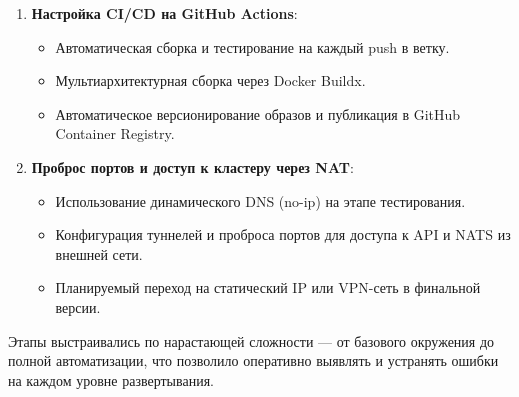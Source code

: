 \documentclass[14pt, a4paper]{extreport}
\begin{document}
\begin{enumerate}
\item \textbf{Настройка CI/CD на GitHub Actions}:
\begin{itemize}
\item Автоматическая сборка и тестирование на каждый push в ветку.
\item Мультиархитектурная сборка через Docker Buildx.
\item Автоматическое версионирование образов и публикация в GitHub Container Registry.
\end{itemize}

\item \textbf{Проброс портов и доступ к кластеру через NAT}:
\begin{itemize}
\item Использование динамического DNS (no-ip) на этапе тестирования.
\item Конфигурация туннелей и проброса портов для доступа к API и NATS из внешней сети.
\item Планируемый переход на статический IP или VPN-сеть в финальной версии.
\end{itemize}
\end{enumerate}

Этапы выстраивались по нарастающей сложности — от базового окружения до полной автоматизации, что позволило оперативно выявлять и устранять ошибки на каждом уровне развертывания.















\end{document}
